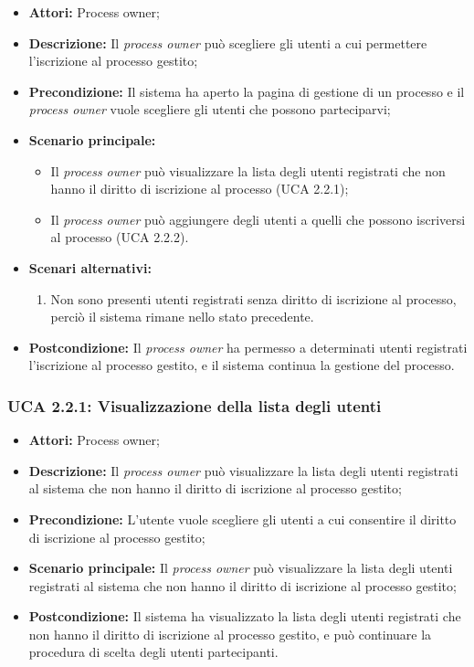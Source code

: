 \begin{itemize}
\item \textbf{Attori:} Process owner;
\item \textbf{Descrizione:}
Il \textit{process owner} può scegliere gli utenti a cui permettere l'iscrizione al processo gestito;
\item \textbf{Precondizione:}
Il sistema ha aperto la pagina di gestione di un processo e il \textit{process owner} vuole scegliere gli utenti che possono parteciparvi;
\item \textbf{Scenario principale:}
\begin{itemize}
\item Il \textit{process owner} può visualizzare la lista degli utenti registrati che non hanno il diritto di iscrizione al processo (UCA 2.2.1);
\item Il \textit{process owner} può aggiungere degli utenti a quelli che possono iscriversi al processo (UCA 2.2.2).
\end{itemize}
\item \textbf{Scenari alternativi:}
\begin{enumerate}
\item Non sono presenti utenti registrati senza diritto di iscrizione al processo, perciò il sistema rimane nello stato precedente.
\end{enumerate}
\item \textbf{Postcondizione:}
Il \textit{process owner} ha permesso a determinati utenti registrati l'iscrizione al processo gestito, e il sistema continua la gestione del processo.
\end{itemize}

\hypertarget{A2.2.1}{}
\subsubsection{UCA 2.2.1: Visualizzazione della lista degli utenti}
\begin{itemize}
\item \textbf{Attori:} Process owner;
\item \textbf{Descrizione:}
Il \textit{process owner} può visualizzare la lista degli utenti registrati al sistema che non hanno il diritto di iscrizione al processo gestito;
\item \textbf{Precondizione:}
L'utente vuole scegliere gli utenti a cui consentire il diritto di iscrizione al processo gestito;
\item \textbf{Scenario principale:}
Il \textit{process owner} può visualizzare la lista degli utenti registrati al sistema che non hanno il diritto di iscrizione al processo gestito;
\item \textbf{Postcondizione:}
Il sistema ha visualizzato la lista degli utenti registrati che non hanno il diritto di iscrizione al processo gestito, e può continuare la procedura di scelta degli utenti partecipanti.
\end{itemize}

